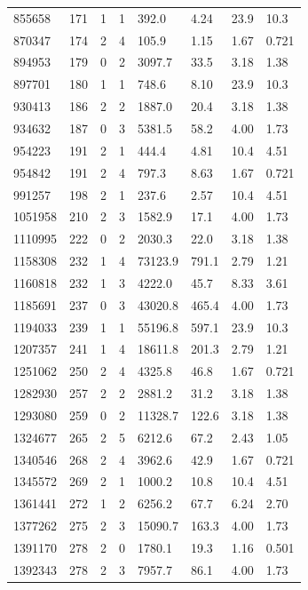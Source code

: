 \documentclass[preview]{standalone}
\begin{document}
{{{\begin{tabular}{L{1.2cm}C{1.2cm} C{0.3cm}C{0.5cm} C{1.4cm}C{1.4cm} C{1.4cm}C{1.4cm}}
  855658  &   171  & 1     &  1 &  392.0  & 4.24  & 23.9 &  10.3   \\ 
  870347  &   174  & 2     &  4 &  105.9  & 1.15  & 1.67 &  0.721   \\ 
  894953  &   179  & 0     &  2 &  3097.7  & 33.5  & 3.18 &  1.38   \\ 
  897701  &   180  & 1     &  1 &  748.6  & 8.10  & 23.9 &  10.3   \\ 
  930413  &   186  & 2     &  2 &  1887.0  & 20.4  & 3.18 &  1.38   \\ 
  934632  &   187  & 0     &  3 &  5381.5  & 58.2  & 4.00 &  1.73   \\ 
  954223  &   191  & 2     &  1 &  444.4  & 4.81  & 10.4 &  4.51   \\ 
  954842  &   191  & 2     &  4 &  797.3  & 8.63  & 1.67 &  0.721   \\ 
  991257  &   198  & 2     &  1 &  237.6  & 2.57  & 10.4 &  4.51   \\ 
  1051958  &   210  & 2     &  3 &  1582.9  & 17.1  & 4.00 &  1.73   \\ 
  1110995  &   222  & 0     &  2 &  2030.3  & 22.0  & 3.18 &  1.38   \\ 
  1158308  &   232  & 1     &  4 &  73123.9  & 791.1  & 2.79 &  1.21   \\ 
  1160818  &   232  & 1     &  3 &  4222.0  & 45.7  & 8.33 &  3.61   \\ 
  1185691  &   237  & 0     &  3 &  43020.8  & 465.4  & 4.00 &  1.73   \\ 
  1194033  &   239  & 1     &  1 &  55196.8  & 597.1  & 23.9 &  10.3   \\ 
  1207357  &   241  & 1     &  4 &  18611.8  & 201.3  & 2.79 &  1.21   \\ 
  1251062  &   250  & 2     &  4 &  4325.8  & 46.8  & 1.67 &  0.721   \\ 
  1282930  &   257  & 2     &  2 &  2881.2  & 31.2  & 3.18 &  1.38   \\ 
  1293080  &   259  & 0     &  2 &  11328.7  & 122.6  & 3.18 &  1.38   \\ 
  1324677  &   265  & 2     &  5 &  6212.6  & 67.2  & 2.43 &  1.05   \\ 
  1340546  &   268  & 2     &  4 &  3962.6  & 42.9  & 1.67 &  0.721   \\ 
  1345572  &   269  & 2     &  1 &  1000.2  & 10.8  & 10.4 &  4.51   \\ 
  1361441  &   272  & 1     &  2 &  6256.2  & 67.7  & 6.24 &  2.70   \\ 
  1377262  &   275  & 2     &  3 &  15090.7  & 163.3  & 4.00 &  1.73   \\ 
  1391170  &   278  & 2     &  0 &  1780.1  & 19.3  & 1.16 &  0.501   \\ 
  1392343  &   278  & 2     &  3 &  7957.7  & 86.1  & 4.00 &  1.73   \\ 
\hline 
\end{tabular} 

}}}
\end{document}
